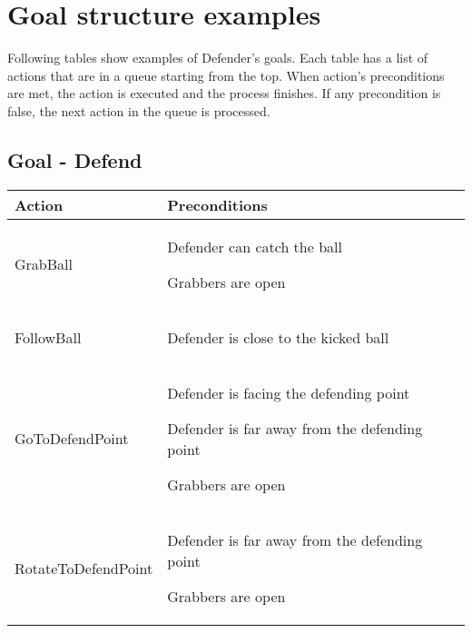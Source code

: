 \section{Goal structure examples} \label{goalstructure}

Following tables show examples of Defender's goals. Each table has a list of actions that are in a queue starting from the top. When action's preconditions are met, the action is executed and the process finishes. If any precondition is false, the next action in the queue is processed.


\subsection{Goal - Defend}

\begin{center}

\renewcommand{\arraystretch}{1.5}
\begin{tabular}{ | >{\centering\arraybackslash}m{42mm} | >{\centering\arraybackslash}p{110mm} | }
\hline
\textbf{Action} & \textbf{Preconditions} \\ \hline
GrabBall &
\begin{compactitem}
\item Defender can catch the ball
\item Grabbers are open
\end{compactitem}  \\ \hline

FollowBall &
\begin{compactitem}
\item Defender is close to the kicked ball
\end{compactitem}  \\ \hline

GoToDefendPoint &
\begin{compactitem}
\item Defender is facing the defending point
\item Defender is far away from the defending point
\item Grabbers are open
\end{compactitem}  \\ \hline

RotateToDefendPoint &
\begin{compactitem}
\item Defender is far away from the defending point
\item Grabbers are open
\end{compactitem}  \\ \hline


\end{tabular}
\end{center}
